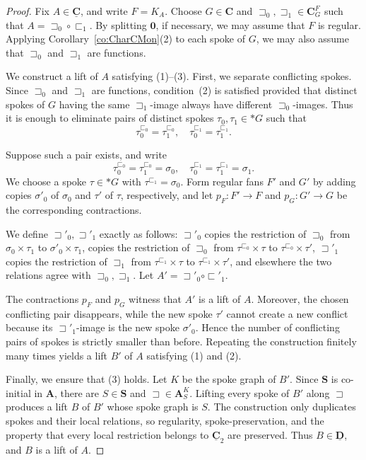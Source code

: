 \documentclass[10pt,a4paper]{amsart}
\newcommand \AAb{\mathbf{A}}
\newcommand \CCb{\mathbf{C}}
\newcommand \CCub{\underline{\mathbf{C}}}
\newcommand \DDub{\underline{\mathbf{D}}}
\newcommand \SSb{\mathbf{S}}
\newcommand \rt{\mathbf{0}}
\newcommand \sqsb{\sqsubset}
\newcommand \sqsp{\sqsupset}
\begin{document}
\begin{proof}
	Fix $A\in\CCub$, and write $F=K_A$. Choose $G\in\CCb$ and
	$\sqsp_0,\sqsp_1\in\CCb_G^F$ such that $A=\sqsp_0\circ\sqsb_1$. 
	By splitting $\rt$, if necessary, we may assume that $F$ is regular.
	Applying Corollary~\ref{co:CharCMon}(2) to each spoke of $G$, we may
	also assume that $\sqsp_0$ and $\sqsp_1$ are functions.
	
	We construct a lift of $A$ satisfying (1)--(3). First, we separate conflicting spokes. Since $\sqsp_0$ and $\sqsp_1$ are functions, condition~(2) is satisfied
	provided that distinct spokes of $G$ having the same
	$\sqsp_1$-image always have different $\sqsp_0$-images. Thus it is
	enough to eliminate pairs of distinct spokes
	$\tau_0,\tau_1\in *G$ such that
	\[
	\tau_0^{\sqsb_0}=\tau_1^{\sqsb_0},
	\quad
	\tau_0^{\sqsb_1}=\tau_1^{\sqsb_1}.
	\]
	
	Suppose such a pair exists, and write
	\[
	\tau_0^{\sqsb_0}=\tau_1^{\sqsb_0}=\sigma_0,
	\quad
	\tau_0^{\sqsb_1}=\tau_1^{\sqsb_1}=\sigma_1.
	\]
	We choose a spoke $\tau\in *G$ with
	$\tau^{\sqsb_1}=\sigma_0$.
	Form regular fans $F'$ and $G'$ by adding copies
	$\sigma'_0$ of $\sigma_0$ and $\tau'$ of $\tau$, respectively,
	and let
	$p_F:F'\to F$ and $p_G:G'\to G$
	be the corresponding contractions.
	
	We define $\sqsp'_0,\sqsp'_1$ exactly as follows:
	$\sqsp'_0$ copies the restriction of $\sqsp_0$ from
	$\sigma_0\times\tau_1$ to $\sigma'_0\times\tau_1$,
	copies the restriction of $\sqsp_0$ from
	$\tau^{\sqsb_0}\times\tau$ to
	$\tau^{\sqsb_0}\times\tau'$,
	$\sqsp'_1$ copies the restriction of $\sqsp_1$ from
	$\tau^{\sqsb_1}\times\tau$ to
	$\tau^{\sqsb_1}\times\tau'$,
	and elsewhere the two relations agree with
	$\sqsp_0,\sqsp_1$.
	Let $A'=\sqsp'_0\circ\sqsb'_1$.
	
	The contractions $p_F$ and $p_G$ witness that $A'$ is a lift of $A$.
	Moreover, the chosen conflicting pair disappears, while the new spoke
	$\tau'$ cannot create a new conflict because its
	$\sqsp'_1$-image is the new spoke $\sigma'_0$.
	Hence the number of conflicting pairs of spokes is strictly smaller
	than before. Repeating the construction finitely many times yields a
	lift $B'$ of $A$ satisfying (1) and (2).
	
	Finally, we ensure that (3) holds. Let $K$ be the spoke graph of $B'$. Since $\SSb$ is co-initial in $\AAb$, there are $S\in\SSb$ and $\sqsp\in\AAb^K_S$. 
	Lifting every spoke of $B'$ along $\sqsp$ produces a lift $B$ of $B'$ whose spoke graph is $S$. The construction only duplicates spokes and their local relations, so regularity, spoke-preservation, and the property that every local restriction belongs to $\CCub_2$ are preserved. Thus $B\in\DDub$, and $B$ is a lift of $A$.
	
\end{proof}
\end{document}

